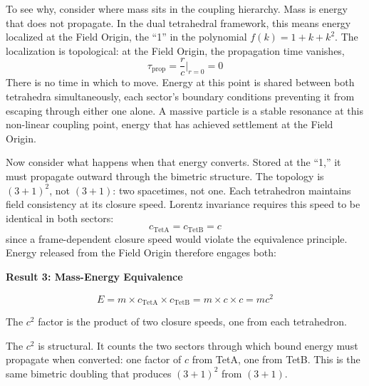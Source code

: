 \documentclass[aps,prd,preprint,superscriptaddress,showpacs,preprintnumbers,amsmath,amssymb,nofootinbib]{revtex4-2}
\begin{document}
To see why, consider where mass sits in the coupling hierarchy. Mass is energy that does not propagate. In the dual tetrahedral framework, this means energy localized at the Field Origin, the ``1'' in the polynomial $f(k) = 1 + k + k^2$. The localization is topological: at the Field Origin, the propagation time vanishes,
\begin{equation}
\tau_{\text{prop}} = \frac{r}{c}\bigg|_{r=0} = 0
\label{eq:tau-zero-mass}
\end{equation}
There is no time in which to move. Energy at this point is shared between both tetrahedra simultaneously, each sector's boundary conditions preventing it from escaping through either one alone. A massive particle is a stable resonance at this non-linear coupling point, energy that has achieved settlement at the Field Origin.

Now consider what happens when that energy converts. Stored at the ``1,'' it must propagate outward through the bimetric structure. The topology is $(3+1)^2$, not $(3+1)$: two spacetimes, not one. Each tetrahedron maintains field consistency at its closure speed. Lorentz invariance requires this speed to be identical in both sectors:
\begin{equation}
c_{\text{TetA}} = c_{\text{TetB}} = c
\label{eq:closure-speeds}
\end{equation}
since a frame-dependent closure speed would violate the equivalence principle. Energy released from the Field Origin therefore engages both:

\vspace{1.5em}
\noindent
\colorbox{resultgreen}{\parbox{\dimexpr\textwidth-2\fboxsep\relax}{%
\vspace{0.8em}
\centering
\textbf{\large Result 3: Mass-Energy Equivalence}

\vspace{0.5em}
\boldmath
\begin{equation}
E = m \times c_{\text{TetA}} \times c_{\text{TetB}} = m \times c \times c = mc^2
\end{equation}
\unboldmath

\vspace{0.3em}
The $c^2$ factor is the product of two closure speeds, one from each tetrahedron.
\vspace{0.5em}
}}
\vspace{1cm}

The $c^2$ is structural. It counts the two sectors through which bound energy must propagate when converted: one factor of $c$ from TetA, one from TetB. This is the same bimetric doubling that produces $(3+1)^2$ from $(3+1)$.
\end{document}
